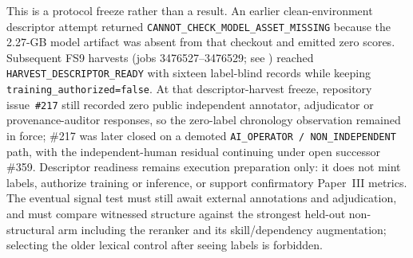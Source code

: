 \begin{sloppypar}
This is a protocol freeze rather than a result.  An earlier clean-environment descriptor attempt returned \texttt{CANNOT\_CHECK\_MODEL\_ASSET\_MISSING} because the 2.27-GB model artifact was absent from that checkout and emitted zero scores.  Subsequent FS9 harvests (jobs 3476527--3476529; see ) reached \texttt{HARVEST\_DESCRIPTOR\_READY} with sixteen label-blind records while keeping \texttt{training\_authorized=false}.  At that descriptor-harvest freeze, repository issue~\texttt{\#217} still recorded zero public independent annotator, adjudicator or provenance-auditor responses, so the zero-label chronology observation remained in force; \#217 was later closed on a demoted \texttt{AI\_OPERATOR / NON\_INDEPENDENT} path, with the independent-human residual continuing under open successor \#359.  Descriptor readiness remains execution preparation only: it does not mint labels, authorize training or inference, or support confirmatory Paper~III metrics.  The eventual signal test must still await external annotations and adjudication, and must compare witnessed structure against the strongest held-out non-structural arm including the reranker and its skill/dependency augmentation; selecting the older lexical control after seeing labels is forbidden.
\end{sloppypar}
